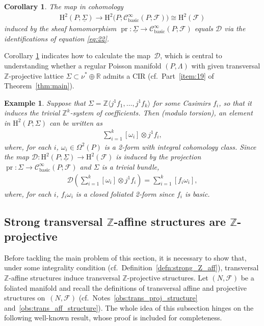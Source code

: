 \documentclass[10pt,a4paper]{amsart}
\numberwithin{equation}{section}
\newtheorem{Corollary}[Theorem]{Corollary}
\newtheorem{Example}[Theorem]{Example}
\newcommand{\pr}{\operatorname{pr}}
\newcommand{\PM}{(P,\Lambda)} %
\newcommand{\HH}{\mathrm{H}}
\newcommand{\RR}{\mathbb{R}}
\newcommand{\ZZ}{\mathbb{Z}}
\begin{document}
\begin{Corollary}\label{cor:po}
 The map in cohomology
 \begin{gather*}
 \HH^2(P;\underline{\Sigma}) \to \HH^2\big(P;\mathcal{C}^{\infty}_{\mathrm{basic}}(P;\mathcal{F})\big) \cong \HH^2(\mathcal{F})
 \end{gather*}
induced by the sheaf homomorphism $\pr \colon \underline{\Sigma} \to \mathcal{C}^{\infty}_{\mathrm{basic}}(P;\mathcal{F})$ equals $\mathcal{D}$ via the identifications of equation \eqref{eq:22}.
\end{Corollary}

Corollary \ref{cor:po} indicates how to calculate the map~$\mathcal{D}$, which is central to understanding whether a regular Poisson manifold $\PM$ with given transversal $\ZZ$-projective lattice $\Sigma \subset \nu^* \oplus \RR$ admits a CIR (cf.\ Part~\ref{item:19} of Theorem~\ref{thm:main}).

\begin{Example} \label{exm:trivial_tips}
Suppose that $\Sigma = \ZZ \langle j^1 f_1 ,\ldots, j^1 f_k \rangle$ for some Casimirs $f_i$, so that it induces the trivial $\ZZ^k$-system of coef\/f\/icients. Then (modulo torsion), an element in $\HH^2(P;\Sigma)$ can be written as
 \begin{gather*}
 \sum\limits_{i=1}^k [\omega_i] \otimes j^1 f_i,
 \end{gather*}
where, for each $i$, $\omega_i \in \Omega^2(P)$ is a 2-form with integral cohomology class. Since the map $\mathcal{D} \colon \HH^2(P;\underline{\Sigma}) \to \HH^2(\mathcal{F})$ is induced by the projection $\pr \colon \Sigma \to \mathcal{C}^{\infty}_{\mathrm{basic}}(P;\mathcal{F})$ and $\Sigma$ is a trivial bundle,
\begin{gather*}
 \mathcal{D} \left(\sum\limits_{i=1}^k [\omega_i] \otimes j^1 f_i\right) = \sum\limits_{i=1}^k [f_i \omega_i],
 \end{gather*}
where, for each $i$, $f_i\omega_i$ is a closed foliated 2-form since $f_i$ is basic.
\end{Example}

\subsection{Strong transversal $\ZZ$-af\/f\/ine structures are $\ZZ$-projective}\label{sec:strong-transv-zz}
Before tackling the main problem of this section, it is necessary to show that, under some integrality condition (cf.\ Def\/inition~\ref{defn:strong_Z_aff}), transversal $\ZZ$-af\/f\/ine structures induce transversal $\ZZ$-projective structures. Let $(N,\mathcal{F})$ be a foliated manifold and recall the def\/initions of transversal af\/f\/ine and projective structures on~$(N,\mathcal{F})$ (cf.\ Notes~\ref{obs:trans_proj_structure} and~\ref{obs:trans_aff_structure}). The whole idea of this subsection hinges on the following well-known result, whose proof is included for completeness.
\end{document}
